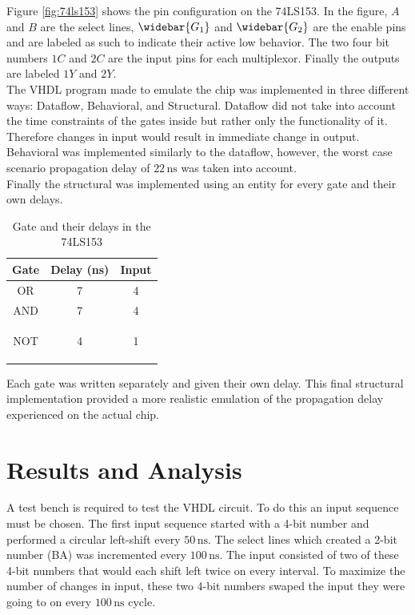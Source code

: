 \documentclass[CMPE]{KGCOEReport}
\begin{document}
Figure \ref{fig:74ls153} shows the pin configuration on the 74LS153. In the figure, $A$ and $B$ are the select lines, $\widebar{G_1}$ and $\widebar{G_2}$ are the enable pins and are labeled as such to indicate their active low behavior. The two four bit numbers $1C$ and $2C$ are the input pins for each multiplexor. Finally the outputs are labeled $1Y$ and $2Y$.\\

The VHDL program made to emulate the chip was implemented in three different ways: Dataflow, Behavioral, and Structural. Dataflow did not take into account the time constraints of the gates inside but rather only the functionality of it. Therefore changes in input would result in immediate change in output. Behavioral was implemented similarly to the dataflow, however, the worst case scenario propagation delay of $22\,\si{\nano\s}$ was taken into account.\\

Finally the structural was implemented using an entity for every gate and their own delays.
\pagebreak

\begin{table}[htbp]
\renewcommand{\arraystretch}{1.2}
\setlength{\tabcolsep}{12pt}
\begin{center}
\caption{Gate and their delays in the 74LS153}
\begin{tabular}{c|c|c}
Gate & Delay (ns) & Input\\\hline
OR & 7 & 4\\\hline
AND & 7 & 4\\\hline
NOT & 4 & 1 

\label{tab:gates}
\end{tabular}
\end{center}
\end{table}

Each gate was written separately and given their own delay. This final structural implementation provided a more realistic emulation of the propagation delay experienced on the actual chip.

\section*{Results and Analysis}

A test bench is required to test the VHDL circuit. To do this an input sequence must be chosen. The first input sequence started with a 4-bit number and performed a circular left-shift every $50\,\si{\nano\s}$. The select lines which created a 2-bit number (BA) was incremented every $100\,\si{\nano\s}$. The input consisted of two of these 4-bit numbers that would each shift left twice on every interval. To maximize the number of changes in input, these two 4-bit numbers swaped the input they were going to on every $100\,\si{\nano\s}$ cycle.
\end{document}
